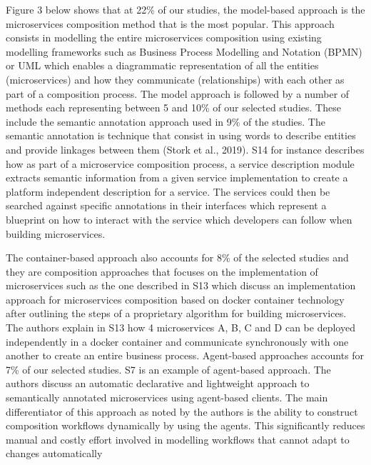 \documentclass{article}
\begin{document}
\begin{multicols}{2}
Figure 3 below shows that at 22\% of our studies, the model-based approach is the microservices composition method that is the most popular. This approach consists in modelling the entire microservices composition using existing modelling frameworks such as Business Process Modelling and Notation (BPMN) or UML which enables a diagrammatic representation of all the entities (microservices) and how they communicate (relationships) with each other as part of a composition process. The model approach is followed by a number of methods each representing between 5 and 10\% of our selected studies. These include the semantic annotation approach used in 9\% of the studies. The semantic annotation is technique that consist in using words to describe entities and provide linkages between them (Stork et al., 2019). S14 for instance describes how as part of a microservice composition process, a service description module extracts semantic information from a given service implementation to create a platform independent description for a service. The services could then be searched against specific annotations in their interfaces which represent a blueprint on how to interact with the service which developers can follow when building microservices. 

The container-based approach also accounts for 8\% of the selected studies and they are composition approaches that focuses on the implementation of microservices such as the one described in S13 which discuss an implementation approach for microservices composition based on docker container technology after outlining the steps of a proprietary algorithm for building microservices. The authors explain in S13 how 4 microservices A, B, C and D can be deployed independently in a docker container and communicate synchronously with one another to create an entire business process. Agent-based approaches accounts for 7\% of our selected studies. S7 is an example of agent-based approach. The authors discuss an automatic declarative and lightweight approach to semantically annotated microservices using agent-based clients. The main differentiator of this approach as noted by the authors is the ability to construct composition workflows dynamically by using the agents. This significantly reduces manual and costly effort involved in modelling workflows that cannot adapt to changes automatically 


\end{multicols}
\end{document}
